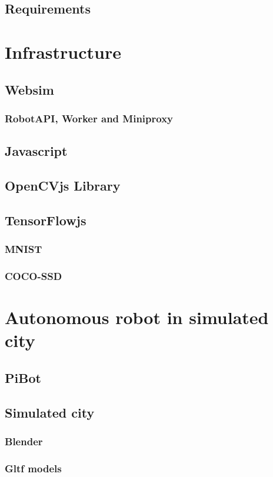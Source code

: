 \documentclass[11pt]{article}
\begin{document}
\subsection{Requirements}

\section{Infrastructure}
\subsection{Websim}
\subsubsection{RobotAPI, Worker and Miniproxy}
\subsection{Javascript}
\subsection{OpenCVjs Library}
\subsection{TensorFlowjs}
\subsubsection{MNIST}
\subsubsection{COCO-SSD}


\section{Autonomous robot in simulated city}
\subsection{PiBot}
\subsection{Simulated city}
\subsubsection{Blender}
\subsubsection{Gltf models}
\end{document}
